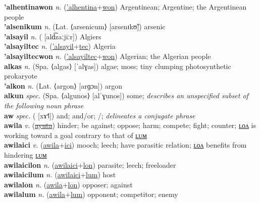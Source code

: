\textbf{'alhentinawon} \textit{n.} (\hyperref['alhentina]{'alhentina}+\hyperref[won]{won})
Argentinean; Argentine; the Argentinean people \label{'alhentinawon} \\
\textbf{'alsenikum} \textit{n.} (Lat. ⟨arsenicum⟩ [arsenɪkʊ̃])
arsenic \label{'alsenikum} \\
\textbf{'alsayil} \textit{n.} ( [ald͡zaːjiːr])
Algiers \label{'alsayil} \\
\textbf{'alsayiltec} \textit{n.} (\hyperref['alsayil]{'alsayil}+\hyperref[tec]{tec})
Algeria \label{'alsayiltec} \\
\textbf{'alsayiltecwon} \textit{n.} (\hyperref['alsayiltec]{'alsayiltec}+\hyperref[won]{won})
Algerian; the Algerian people \label{'alsayiltecwon} \\
\textbf{alkas} \textit{n.} (Spa. ⟨algas⟩ [ˈalɣas])
algae; moss; tiny clumping photosynthetic prokaryote \label{alkas} \\
\textbf{'alkon} \textit{n.} (Lat. ⟨argon⟩ [arɡɔn])
argon \label{'alkon} \\
\textbf{alkun} \textit{spec.} (Spa. ⟨algunos⟩ [alˈɣunos])
some; \textit{describes an unspecified subset of the following noun phrase} \label{alkun} \\
\textbf{aw} \textit{spec.} ( [xɤ˧˥])
and; and/or; /; \textit{delineates a conjugate phrase} \label{aw} \\
\textbf{awila} \textit{v.} (\hyperref[ayuta]{\sout{ayuta}})
hinder; be against; oppose; harm; compete; fight; counter; \hyperref[awilalon]{ʟᴏᴧ} is working toward a goal contrary to that of \hyperref[awilalum]{ʟᴜᴍ} \label{awila} \\
\textbf{awilaici} \textit{v.} (\hyperref[awila]{awila}+\hyperref[ici]{ici})
mooch; leech; have parasitic relation; \hyperref[awilaicilon]{ʟᴏᴧ} benefits from hindering \hyperref[awilaicilum]{ʟᴜᴍ} \label{awilaici} \\
\textbf{awilaicilon} \textit{n.} (\hyperref[awilaici]{awilaici}+\hyperref[lon]{lon})
parasite; leech; freeloader \label{awilaicilon} \\
\textbf{awilaicilum} \textit{n.} (\hyperref[awilaici]{awilaici}+\hyperref[lum]{lum})
host \label{awilaicilum} \\
\textbf{awilalon} \textit{n.} (\hyperref[awila]{awila}+\hyperref[lon]{lon})
opposer; against \label{awilalon} \\
\textbf{awilalum} \textit{n.} (\hyperref[awila]{awila}+\hyperref[lum]{lum})
opponent; competitor; enemy \label{awilalum} \\
